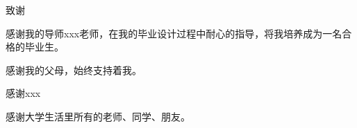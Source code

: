 \clearpage
{}
\begin{center}
	{\fontsize{14}{21}致\quad 谢}
\end{center}

感谢我的导师xxx老师，在我的毕业设计过程中耐心的指导，将我培养成为一名合格的毕业生。

感谢我的父母，始终支持着我。

感谢xxx

感谢大学生活里所有的老师、同学、朋友。

\clearpage